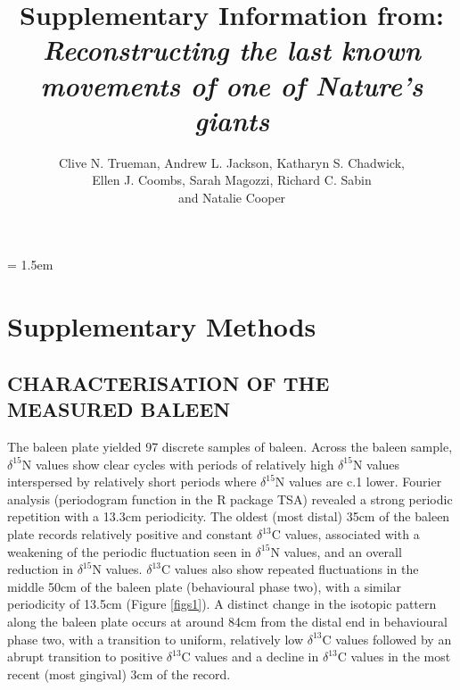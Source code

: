 \documentclass[a4paper,12pt]{article}
\title{Supplementary Information from:\\
\textit{Reconstructing the last known movements of one of Nature's giants}}
\author{Clive N. Trueman, Andrew L. Jackson, Katharyn S. Chadwick,\\ 
Ellen J. Coombs, Sarah Magozzi, Richard C. Sabin\\
and Natalie Cooper}
\date{}
\begin{document}

\maketitle

\parindent = 1.5em
\addtolength{\parskip}{.3em}


\section*{Supplementary Methods}
 
\subsection*{CHARACTERISATION OF THE MEASURED BALEEN}
The baleen plate yielded 97 discrete samples of baleen. 
Across the baleen sample, $\delta^{15}$N values show clear cycles with periods of relatively high $\delta^{15}$N values interspersed by relatively short periods where $\delta^{15}$N values are c.1\text{\textperthousand} lower. 
Fourier analysis (periodogram function in the R package TSA\cite{Chan:2012aa}) revealed a strong periodic repetition with a 13.3cm periodicity. 
The oldest (most distal) 35cm of the baleen plate records relatively positive and constant $\delta^{13}$C values, associated with a weakening of the periodic fluctuation seen in $\delta^{15}$N values, and an overall reduction in $\delta^{15}$N values. 
$\delta^{13}$C values also show repeated fluctuations in the middle 50cm of the baleen plate (behavioural phase two), with a similar periodicity of 13.5cm (Figure \ref{figs1}). 
A distinct change in the isotopic pattern along the baleen plate occurs at around 84cm from the distal end in behavioural phase two, with a transition to uniform, relatively low $\delta^{13}$C values followed by an abrupt transition to positive $\delta^{13}$C values and a decline in $\delta^{13}$C values in the most recent (most gingival) 3cm of the record.
\end{document}
